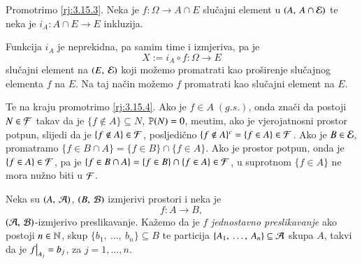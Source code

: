 \begin{rj}[\ref{zad:3.15}]
    Promotrimo \ref{rj:3.15.3}.
    Neka je $f: \Omega \to A \cap E$ slu\v cajni element u $({A}, \: {A \cap \mathcal{E}})$ te neka je $i_A : A \cap E \to E$ inkluzija.
    \begin{figure}[H]
        \centering
    \end{figure}
    Funkcija $i_A$ je neprekidna, pa samim time i izmjeriva, pa je
    \begin{equation*}
        X := i_A \circ f : \Omega \to E
    \end{equation*}
    slu\v cajni element na $({E}, \: {\mathcal{E}})$ koji mo\v zemo promatrati kao pro\v sirenje slu\v cajnog elementa $f$ na $E$.
    Na taj na\v cin mo\v zemo $f$ promatrati kao slu\v cajni element na $E$.

    Te na kraju promotrimo \ref{rj:3.15.4}.
    Ako je $f \in A \; (g.s.)$, onda zna\v ci da postoji $N \in \mathcal{F}$ takav da je $\{f \notin A\} \subseteq N$, $\mathbb{P}({N}) = 0$, me\dj utim, ako je vjerojatnosni prostor potpun, slijedi da je $\{f \notin A\} \in \mathcal{F}$, posljedi\v cno $\{f \notin A\}^c = \{f \in A\} \in \mathcal{F}$.
    Ako je $B \in \mathcal{E}$, promatramo $\{f \in B \cap A\} = \{ f \in B \} \cap \{f \in A\}$.
    Ako je prostor potpun, onda je $\{f \in A\} \in \mathcal{F}$, pa je $\{f \in B \cap A\} = \{ f \in B \} \cap \{f \in A\} \in \mathcal{F}$, u suprotnom $\{f \in A\}$ ne mora nu\v zno biti u $\mathcal{F}$.
\end{rj}


\begin{defn}    \label{defn:3.15-1}
    Neka su $({A}, \: {\mathcal{A}})$, $({B}, \: {\mathcal{B}})$ izmjerivi prostori i neka je
    \begin{equation*}
        f: A \to B,    
    \end{equation*}
    $({\mathcal{A}}, \: {\mathcal{B}})$-izmjerivo preslikavanje.
    Ka\v zemo da je $f$ \emph{jednostavno preslikavanje} ako postoji $n \in \mathbb{N}$, skup $\{ b_1, \: \dots, \: b_n \} \subseteq B$ te particija $\{ A_1, \: \dots, \: A_n \} \subseteq \mathcal{A}$ skupa $A$, takvi da je $\restr{f}{A_j} = b_j$, za $j = 1, \dots, n$.
\end{defn}
    

